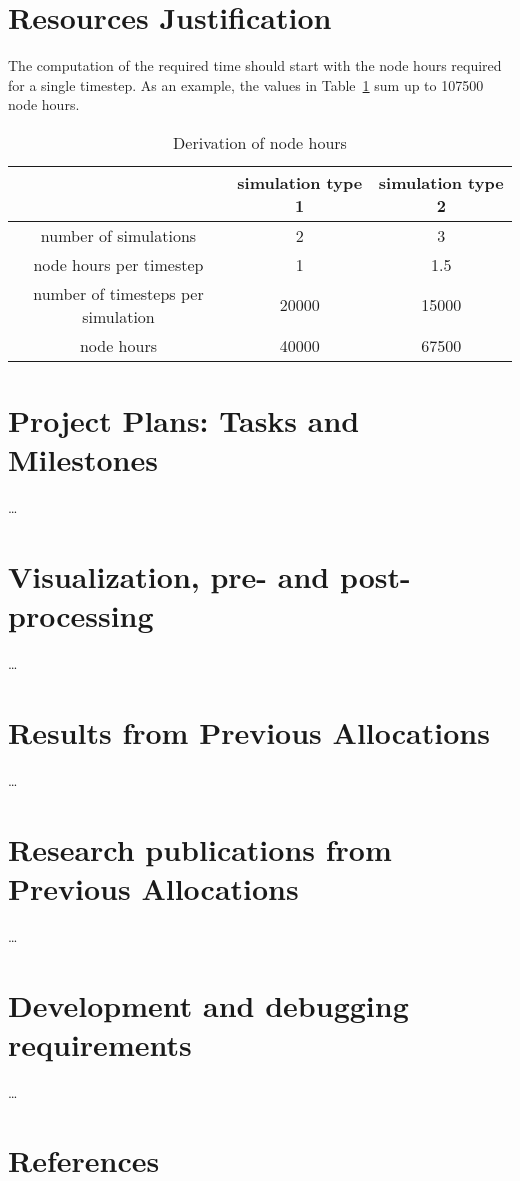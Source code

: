 \documentclass[11pt]{article}
\begin{document}
\section{Resources Justification}
The computation of the required time should start with the node hours required for a single timestep.
As an example, the values in Table~\ref{table:derivation_node_hours} sum up to 107500 node hours.
\begin{table}[H]
 \begin{center}
  \begin{tabular}{|c|c|c|}
   \hline
   & simulation type 1 & simulation type 2 \\ 
   \hline
   number of simulations & 2 & 3 \\
   \hline
   node hours per timestep & 1 & 1.5 \\
   \hline
   number of timesteps per simulation & 20000 & 15000 \\
   \hline
   node hours & 40000 & 67500 \\
   \hline
  \end{tabular}
 \end{center}
 \caption{Derivation of node hours}
 \label{table:derivation_node_hours}
\end{table}

\section{Project Plans: Tasks and Milestones}
\ldots

\section{Visualization, pre- and post-processing}
\ldots

\section{Results from Previous Allocations}
\ldots

\section{Research publications from Previous Allocations}
\ldots

\section{Development and debugging requirements}
\ldots 

\section*{References}


\end{document}
